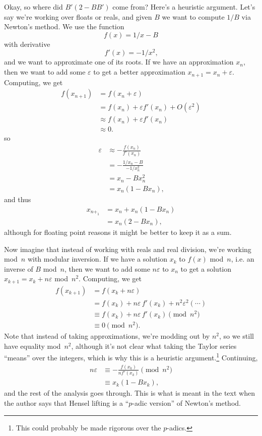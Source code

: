\documentclass{computer-arithmetic}
\begin{document}
Okay, so where did \(B'(2 - BB')\) come from? Here's a heuristic
argument. Let's say we're working over floats or reals, and given
\(B\) we want to compute \(1/B\) via Newton's method. We use the
function
\[
  f(x) = 1/x - B
\]
with derivative
\[
  f'(x) = -1/x^2\text{,}
\]
and we want to approximate one of its roots. If we have an
approximation \(x_n\), then we want to add some \(ε\) to get a better
approximation \(x_{n + 1} = x_n + ε\). Computing, we get
\begin{align*}
  f(x_{n + 1}) &= f(x_n + ε) \\
               &= f(x_n) + ε f'(x_n) + O(ε^2) \\
               &≈ f(x_n) + ε f'(x_n) \\
               &≈ 0\text{.}
\end{align*}
so
\begin{align*}
  ε &≈ -\frac{f(x_n)}{f'(x_n)} \\
    &= -\frac{1/x_n - B}{-1/x_n^2} \\
    &= x_n - B x_n^2 \\
    &= x_n(1 - B x_n)\text{,}
\end{align*}
and thus
\begin{align*}
  x_{n +_1} &= x_n + x_n(1 - B x_n) \\
          &= x_n(2 - B x_n)\text{,}
\end{align*}
although for floating point reasons it might be better to keep it as a
sum.

Now imagine that instead of working with reals and real division,
we're working mod~\(n\) with modular inversion. If we have a solution
\(x_k\) to \(f(x)\) mod~\(n\), i.e. an inverse of \(B\) mod~\(n\),
then we want to add some \(nε\) to \(x_n\) to get a
solution \(x_{k+1} = x_k + nε\) mod~\(n^2\). Computing, we get
\begin{align*}
  f(x_{k+1}) &= f(x_k + nε) \\
             &= f(x_k) + nε \, f'(x_k) + n^2ε^2(⋯) \\
             &≡ f(x_k) + nε \, f'(x_k) \pmod{n^2} \\
             &≡ 0 \pmod{n^2} \text{.}
\end{align*}
Note that instead of taking approximations, we're modding out by
\(n^2\), so we still have equality mod~\(n^2\), although it's not
clear what taking the Taylor series ``means'' over the integers, which
is why this is a heuristic argument.\footnote{This could probably be
  made rigorous over the \(p\)-adics.} Continuing,
\begin{align*}
  nε &≡ -\frac{f(x_k)}{n f'(x_k)} \pmod{n^2} \\
    &≡ x_k(1 - B x_k)\text{,}
\end{align*}
and the rest of the analysis goes through. This is what is meant in
the text when the author says that Hensel lifting is a ``\(p\)-adic
version'' of Newton's method.
\end{document}
